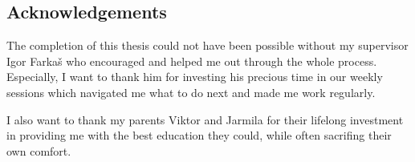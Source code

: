 
\null 
\vfill 

\subsection*{Acknowledgements}

The completion of this thesis could not have been possible without my supervisor Igor Farkaš who encouraged and helped me out through the whole process. Especially, I want to thank him for investing his precious time in our weekly sessions which navigated me what to do next and made me work regularly. 

I also want to thank my parents Viktor and Jarmila for their lifelong investment in providing me with the best education they could, while often sacrifing their own comfort. 
